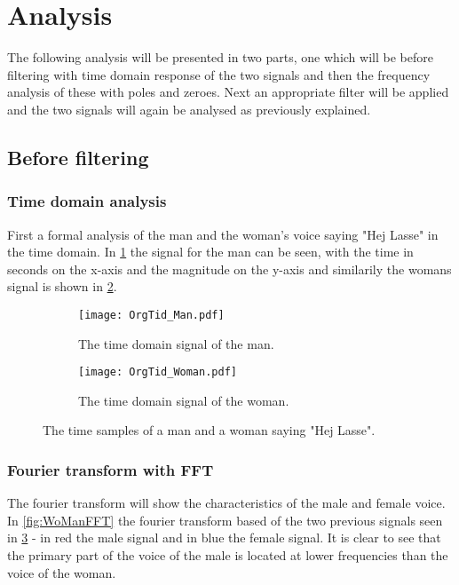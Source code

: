 
\section{Analysis}
\label{sec:analysis}
The following analysis will be presented in two parts, one which will be before filtering with time domain response of the two signals and then the frequency analysis of these with poles and zeroes. Next an appropriate filter will be applied and the two signals will again be analysed as previously explained.

\subsection{Before filtering}

\subsubsection{Time domain analysis}

First a formal analysis of the man and the woman's voice saying "Hej Lasse" in the time domain. In \cref{fig:time_man} the signal for the man can be seen, with the time in seconds on the x-axis and the magnitude on the y-axis and similarily the womans signal is shown in \cref{fig:time_woman}.

\begin{figure}[h]
	\centering
	\begin{subfigure}{0.45\textwidth}
		\texttt{[image: OrgTid\_Man.pdf]}
		\caption{The time domain signal of the man.}
		\label{fig:time_man}
	\end{subfigure}
	\quad
	\begin{subfigure}{0.45\textwidth}
		\texttt{[image: OrgTid\_Woman.pdf]}
		\caption{The time domain signal of the woman.}
		\label{fig:time_woman}
	\end{subfigure}
	\caption{The time samples of a man and a woman saying "Hej Lasse".}
	\label{fig:time_WoMan}
\end{figure}

\subsubsection{Fourier transform with FFT}

The fourier transform will show the characteristics of the male and female voice. In \cref{fig:WoManFFT} the fourier transform based of the two previous signals seen in \cref{fig:time_WoMan} - in red the male signal and in blue the female signal. It is clear to see that the primary part of the voice of the male is located at lower frequencies than the voice of the woman.

